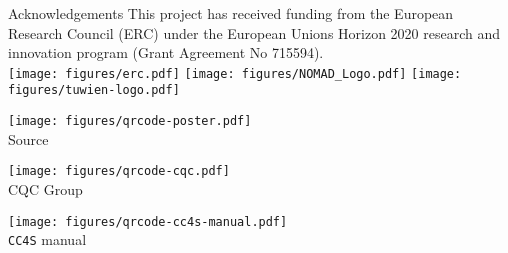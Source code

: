 \begin{block}{\large Acknowledgements}
  This project has received funding from the European Research Council (ERC)
  under the European Unions Horizon 2020 research and innovation program (Grant
  Agreement No 715594). \\
  \vspace*{1cm}
  \texttt{[image: figures/erc.pdf]}
  \hfill
  \texttt{[image: figures/NOMAD\_Logo.pdf]}
  \hfill
  \texttt{[image: figures/tuwien-logo.pdf]} \\
  \vspace*{1cm}
  \begin{minipage}{2.5em}
    \centering
    \texttt{[image: figures/qrcode-poster.pdf]}\\
    {\tiny Source}
  \end{minipage}
  \hfill
  \begin{minipage}{2.5em}
    \centering
    \texttt{[image: figures/qrcode-cqc.pdf]}\\
    {\tiny CQC Group}
  \end{minipage}
  \hfill
  \begin{minipage}{2.5em}
    \centering
    \texttt{[image: figures/qrcode-cc4s-manual.pdf]}\\
    {\tiny \texttt{CC4S} manual}
  \end{minipage}
\end{block}

